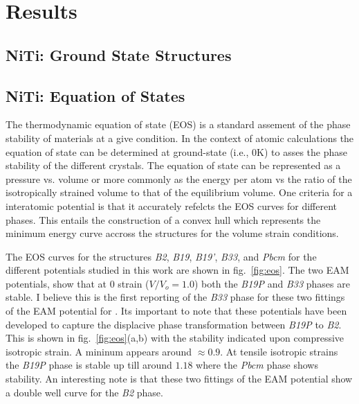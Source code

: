 \documentclass[preprint]{elsarticle}
\begin{document}
\section{Results}
\label{sec:results}

\subsection{NiTi: Ground State Structures}
\label{subsec:nitigs}



\subsection{NiTi: Equation of States}
\label{subsec:nitieos}

The thermodynamic equation of state (EOS) is a standard assement of the phase stability of materials at a give condition. In the context of atomic calculations the equation of state can be determined at ground-state (i.e., 0K) to asses the phase stability of the different crystals. The equation of state can be represented as a pressure vs. volume or more commonly as the energy per atom  vs the ratio of the isotropically strained volume to that of the equilibrium volume. One criteria for a interatomic potential is that it accurately refelcts the EOS curves for different phases. This entails the construction of a convex hull which represents the minimum energy curve accross the structures for the volume strain conditions. \par

The EOS curves for the  structures \textit{B2}, \textit{B19}, \textit{B19'}, \textit{B33}, and \textit{Pbcm}  for the different potentials studied in this work are shown in fig.~\ref{fig:eos}. The two EAM potentials, show that at 0 strain ($V/V_o = 1.0$) both the \textit{B19P} and \textit{B33} phases are stable. I believe this is the first reporting of the \textit{B33} phase for these two fittings of the EAM potential for . Its important to note that these potentials have been developed to capture the displacive phase transformation between \textit{B19P} to \textit{B2}. This is shown in fig.~\ref{fig:eos}(a,b) with the stability indicated upon compressive isotropic strain. A mininum appears around $\approx 0.9$. At tensile isotropic strains the \textit{B19P} phase is stable up till around $1.18$ where the \textit{Pbcm} phase shows stability. An interesting note is that these two fittings of the EAM potential show a double well curve for the \textit{B2} phase. \par
\end{document}
